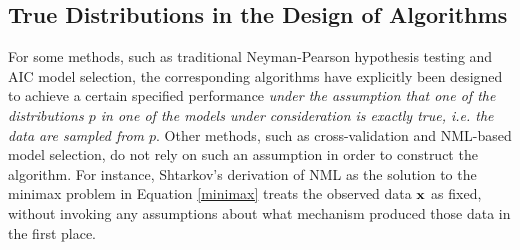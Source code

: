 \documentclass[authoryear]{elsarticle}
\begin{document}
\subsection{True Distributions in the Design of Algorithms}
\label{sec:design}
For some methods, such as  traditional Neyman-Pearson hypothesis
testing and AIC model selection, the corresponding
algorithms have explicitly been designed to achieve a certain specified
performance {\em under the assumption that one of the distributions
  $p$ in one of the models under consideration is exactly true, i.e.
  the data are sampled from $p$}. Other methods, such as
cross-validation and NML-based model selection, do not rely on such an
assumption in order to construct the algorithm. For instance, Shtarkov's
derivation of NML as the solution to the minimax problem in Equation
\ref{minimax} treats the observed data ${\bf x}$ as fixed, without
invoking any assumptions about what mechanism produced those
data in the first place.
\end{document}
